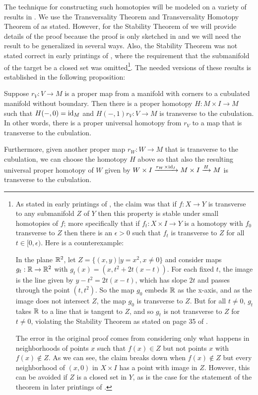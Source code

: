 The technique for constructing such homotopies will be modeled on a variety of results in \cite{GuPo74}.
We use the Transversality Theorem and Transversality Homotopy Theorem of \cite[Section 2.3]{GuPo74} as stated.
However, for the Stability Theorem of \cite[Section 1.6]{GuPo74} we will provide details of the proof because the proof is only sketched in \cite{GuPo74} and we will need the result to be generalized in several ways.
Also, the Stability Theorem was not stated correct in early printings of \cite{GuPo74}, where the requirement that the submanifold of the target be a closed set was omitted\footnote{As stated in early printings of \cite{GuPo74}, the claim was that if $f \colon X \to Y$ is transverse to any submanifold $Z$ of $Y$ then this property is stable under small homotopies of $f$; more specifically that if $f_t:X \times I \to Y$ is a homotopy with $f_0$ transverse to $Z$ then there is an $\epsilon>0$ such that $f_t$ is transverse to $Z$ for all $t\in[0,\epsilon)$.
	Here is a counterexample:

	In the plane $\mathbb{R}^2$, let $Z = \{(x,y)|y = x^2, x\neq 0\}$ and consider maps $g_t: \mathbb{R} \to \mathbb{R}^2$ with
	$g_t(x) = (x,t^2+2t(x-t))$.
	For each fixed $t$, the image is the line given by $y-t^2 = 2t(x-t)$, which has slope $2t$ and passes through the point $(t,t^2)$.
	So the map $g_0$ embeds $\mathbb{R}$ as the x-axis, and as the image does not intersect $Z$, the map $g_0$ is transverse to $Z$.
	But for all $t\neq 0$, $g_t$ takes $\mathbb{R}$ to a line that is tangent to $Z$, and so $g_t$ is not transverse to $Z$ for $t\neq 0$, violating the Stability Theorem as stated on page 35 of \cite{GuPo74}.

	The error in the original proof comes from considering only what happens in neighborhoods of points $x$ such that $f(x) \in Z$ but not points $x$ with $f(x)\notin Z$.
	As we can see, the claim breaks down when $f(x)\notin Z$ but every neighborhood of $(x,0)$ in $X \times I$ has a point with image in $Z$.
	However, this can be avoided if $Z$ is a closed set in $Y$, as is the case for the statement of the theorem in later printings of \cite{GuPo74}.}.
The needed versions of these results is established in the following proposition:

\begin{proposition}\label{P: ball stability}
	Suppose $r_V \colon V \to M$ is a proper map from a manifold with corners to a cubulated manifold without boundary.
	Then there is a proper homotopy $H \colon M \times I \to M$ such that $H(-,0) = \mathrm{id}_M$ and $H(-,1) r_V \colon V \to M$ is transverse to the cubulation.
	In other words, there is a proper universal homotopy from $r_V$ to a map that is transverse to the cubulation.

	Furthermore, given another proper map $r_W \colon W \to M$ that is transverse to the cubulation, we can choose the homotopy $H$ above so that also the resulting universal proper homotopy of $W$ given by $W \times I \xrightarrow{r_W \times \mathrm{id}_I} M \times I \xrightarrow{H} M$ is transverse to the cubulation.
\end{proposition}

